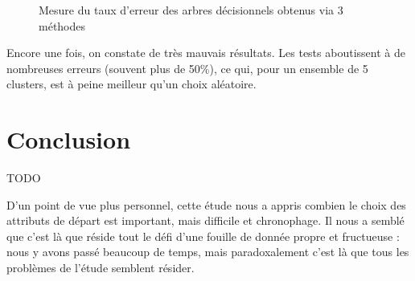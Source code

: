 \begin{figure}[H]
	\centering
	\caption{Mesure du taux d'erreur des arbres décisionnels obtenus via 3 méthodes}
\end{figure}

Encore une fois, on constate de très mauvais résultats. Les tests aboutissent à de nombreuses erreurs (souvent plus de 50\%), ce qui, pour un ensemble de 5 clusters, est à peine meilleur qu'un choix aléatoire.


\section{Conclusion}

{\huge TODO}

D'un point de vue plus personnel, cette étude nous a appris combien le choix des attributs de départ est important, mais difficile et chronophage. Il nous a semblé que c'est là que réside tout le défi d'une fouille de donnée propre et fructueuse : nous y avons passé beaucoup de temps, mais paradoxalement c'est là que tous les problèmes de l'étude semblent résider.

